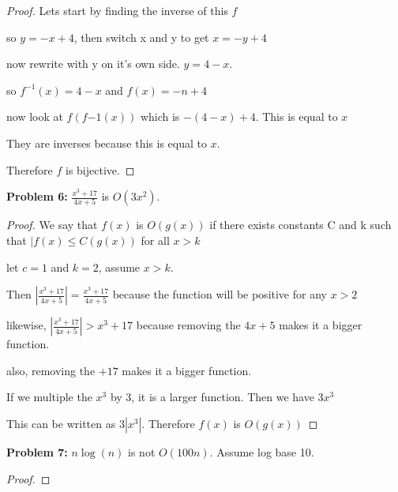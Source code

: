 \documentclass[12pt]{article}
\begin{document}
\begin{proof}

    Lets start by finding the inverse of this $f$

    so $y=-x+4$, then switch x and y to get $x=-y+4$

    now rewrite with y on it's own side. $y=4-x$.

    so $f^{-1}(x)=4-x$ and $f(x)=-n+4$

    now look at $f(f{-1}(x))$ which is $-(4-x)+4$. This is equal to $x$

    They are inverses because this is equal to $x$.

    Therefore $f$ is bijective.

\end{proof}

{\bf Problem 6:} $\frac{x^3+17}{4x+5}$ is $O(3x^2)$. \\

\begin{proof}

    We say that $f(x)$ is $O(g(x))$ if there exists constants C and k such that $|f(x)\le C(g(x))$ for all $x>k$

    let $c=1$ and $k=2$, assume $x>k$.

    Then $|\frac{x^3+17}{4x+5}|=\frac{x^3+17}{4x+5}$ because the function will be positive for any $x>2$

    likewise, $|\frac{x^3+17}{4x+5}|>x^3+17$ because removing the $4x+5$ makes it a bigger function.

    also, removing the $+17$ makes it a bigger function.

    If we multiple the $x^3$ by 3, it is a larger function. Then we have $3x^3$

    This can be written as $3|x^3|$. Therefore $f(x)$ is $O(g(x))$

\end{proof}

{\bf Problem 7:} $n \log(n)$ is not $O(100 n)$. Assume log base 10.\\

\begin{proof}

    

\end{proof}
\end{document}

